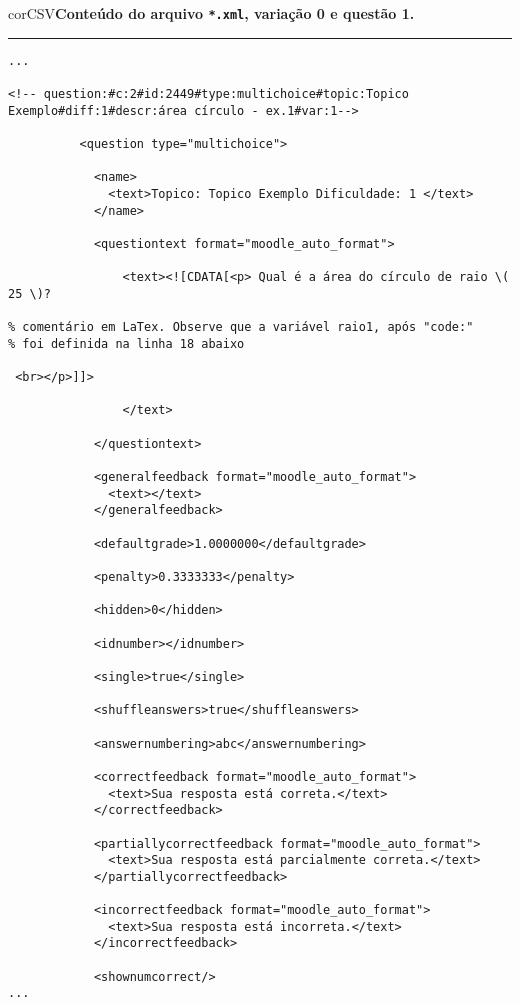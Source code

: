 \begin{myboxCode}{corCSV}{\textbf{Conteúdo do arquivo \texttt{*.xml}, variação 0 e questão 1.}}\vspace{3mm}
\hrule
{\scriptsize
\begin{verbatim}
...

<!-- question:#c:2#id:2449#type:multichoice#topic:Topico Exemplo#diff:1#descr:área círculo - ex.1#var:1-->

          <question type="multichoice">

            <name>
              <text>Topico: Topico Exemplo Dificuldade: 1 </text>
            </name>
            
            <questiontext format="moodle_auto_format">
            
                <text><![CDATA[<p> Qual é a área do círculo de raio \( 25 \)?

% comentário em LaTex. Observe que a variável raio1, após "code:" 
% foi definida na linha 18 abaixo

 <br></p>]]>
 
                </text>

            </questiontext>

            <generalfeedback format="moodle_auto_format">
              <text></text>
            </generalfeedback>
            
            <defaultgrade>1.0000000</defaultgrade>
            
            <penalty>0.3333333</penalty>

            <hidden>0</hidden>
            
            <idnumber></idnumber>
            
            <single>true</single>
            
            <shuffleanswers>true</shuffleanswers>
            
            <answernumbering>abc</answernumbering>
            
            <correctfeedback format="moodle_auto_format">
              <text>Sua resposta está correta.</text>
            </correctfeedback>
            
            <partiallycorrectfeedback format="moodle_auto_format">
              <text>Sua resposta está parcialmente correta.</text>
            </partiallycorrectfeedback>
            
            <incorrectfeedback format="moodle_auto_format">
              <text>Sua resposta está incorreta.</text>
            </incorrectfeedback>

            <shownumcorrect/>    
...
\end{verbatim}
}
\end{myboxCode}


